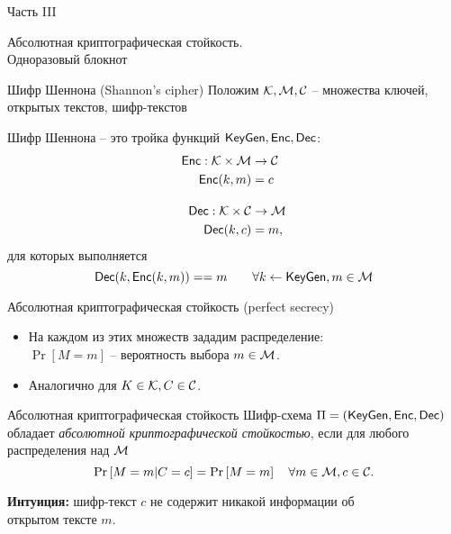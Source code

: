 \documentclass[usenames,dvipsnames,8pt,aspectratio=169]{beamer}
\begin{document}
\begin{frame}
Часть III \\ [10pt]
\begin{LARGE}
	
	\color{Orange}
	\Huge Абсолютная криптографическая стойкость. \\ Одноразовый блокнот\\
	
\end{LARGE}
\end{frame}

\begin{frame}{Шифр Шеннона (Shannon's cipher)}
\Large
Положим $\mathcal{K}, \mathcal{M}, \mathcal{C}$ -- множества ключей, открытых текстов, шифр-текстов 
\begin{block}{Шифр Шеннона --}
	это тройка функций $\textsf{KeyGen}, \textsf{Enc}, \textsf{Dec}$:
	\begin{align*}
	\textsf{Enc}: \mathcal{K} \times \mathcal{M} & \rightarrow \mathcal{C} \\
	\textsf{Enc}(k, m)  &= c  \\[10pt]
	\textsf{Dec}: \mathcal{K} \times \mathcal{C} & \rightarrow \mathcal{M} \\
	\textsf{Dec}(k, c) &= m,
	\end{align*}
	для которых выполняется 
	\[
	\textsf{Dec}(k, \textsf{Enc}(k,m)) == m \qquad \forall k \leftarrow \textsf{KeyGen}, m \in \mathcal{M} 
	\]
\end{block}
\end{frame}

\begin{frame}{Абсолютная криптографическая стойкость (perfect secrecy)}
\Large
\begin{itemize}
\itemsep 5pt
\item На каждом из этих множеств зададим распределение:  \\ $\Pr[M = m]$ -- вероятность выбора $m \in \mathcal{M}$.
\item Аналогично для $K \in \mathcal{K}, C \in \mathcal{C}$.
\end{itemize}

\begin{block}{Абсолютная криптографическая стойкость}
Шифр-схема $\Pi = (\textsf{KeyGen}, \textsf{Enc}, \textsf{Dec})$ обладает \emph{абсолютной криптографической стойкостью}, если для любого распределения над $\mathcal{M}$
\[
\Pr \left[ M= m | C = c\right] = \Pr\left[M = m\right] \quad \forall m \in \mathcal{M}, c \in \mathcal{C}.
\]
\end{block}
\textbf{Интуиция:} шифр-текст $c$ не содержит никакой информации об \\ открытом тексте $m$.
\end{frame}
\end{document}
